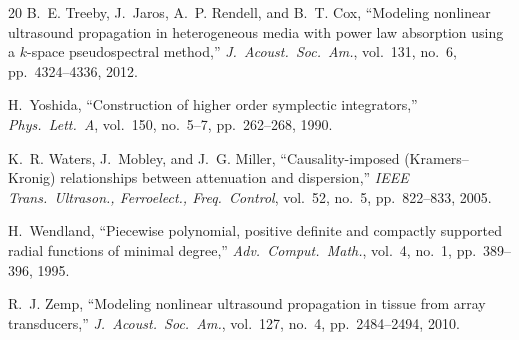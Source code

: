 \documentclass[11pt]{article}
\begin{document}
\begin{thebibliography}{20}
B.~E. Treeby, J.~Jaros, A.~P. Rendell, and B.~T. Cox,
``Modeling nonlinear ultrasound propagation in heterogeneous media
with power law absorption using a $k$-space pseudospectral method,''
\textit{J.\ Acoust.\ Soc.\ Am.}, vol.~131, no.~6, pp.~4324--4336, 2012.

H.~Yoshida,
``Construction of higher order symplectic integrators,''
\textit{Phys.\ Lett.\ A}, vol.~150, no.~5--7, pp.~262--268, 1990.

K.~R. Waters, J.~Mobley, and J.~G. Miller,
``Causality-imposed (Kramers--Kronig) relationships between
attenuation and dispersion,''
\textit{IEEE Trans.\ Ultrason., Ferroelect., Freq.\ Control},
vol.~52, no.~5, pp.~822--833, 2005.

H.~Wendland,
``Piecewise polynomial, positive definite and compactly supported
radial functions of minimal degree,''
\textit{Adv.\ Comput.\ Math.}, vol.~4, no.~1, pp.~389--396, 1995.

R.~J. Zemp,
``Modeling nonlinear ultrasound propagation in tissue from array
transducers,''
\textit{J.\ Acoust.\ Soc.\ Am.}, vol.~127, no.~4, pp.~2484--2494, 2010.

\end{thebibliography}
\end{document}
